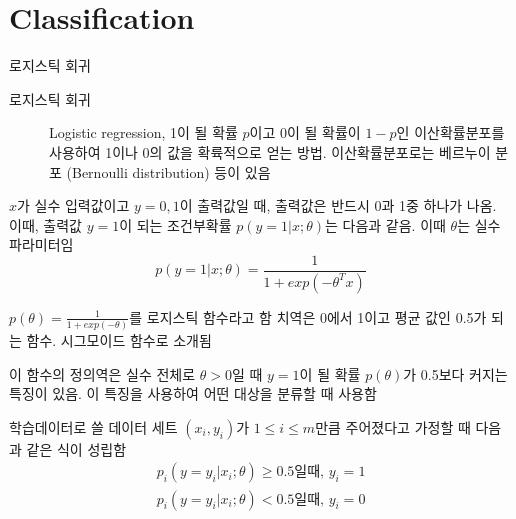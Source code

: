 \documentclass[10pt,t]{beamer}
\begin{document}
\section{Classification}
\begin{frame}{로지스틱 회귀}
    \begin{description}
        \item[로지스틱 회귀] Logistic regression, 1이 될 확률 $p$이고 0이 될 확률이 $1-p$인 이산확률분포를 사용하여 1이나 0의 값을 확륙적으로 얻는  방법. 이산확률분포로는 베르누이 분포 (Bernoulli distribution) 등이 있음
    \end{description}

$x$가 실수 입력값이고 $y={0, 1}$이 출력값일 때, 출력값은 반드시 0과 1중 하나가 나옴. 이때, 출력값 $y=1$이 되는 조건부확률 $p(y=1|x;\theta)$는 다음과 같음. 이때 $\theta$는 실수 파라미터임
\[p(y=1|x;\theta) = \frac{1}{1+exp(-\theta^T x)}\]

\pagebreak

$p(\theta)=\frac{1}{1+exp(-\theta)}$를 로지스틱 함수라고 함 치역은 0에서 1이고 평균 값인 0.5가 되는 함수. 시그모이드 함수로 소개됨

\begin{center}
\end{center}

\pagebreak

이 함수의 정의역은 실수 전체로 $\theta>0$일 때 $y=1$이 될 확률 $p(\theta)$가 0.5보다 커지는 특징이 있음. 이 특징을 사용하여 어떤 대상을 분류할 때 사용함

학습데이터로 쓸 데이터 세트 $(x_i, y_i)$가 $1\leq i \leq m$만큼 주어졌다고 가정할 때 다음과 같은 식이 성립함
\begin{eqnarray*}
    p_i (y= y_i | x_i; \theta) \geq 0.5 \text{일때, } y_i = 1\\
    p_i (y= y_i | x_i; \theta) < 0.5 \text{일때, } y_i = 0
\end{eqnarray*}

\end{frame}
\end{document}
